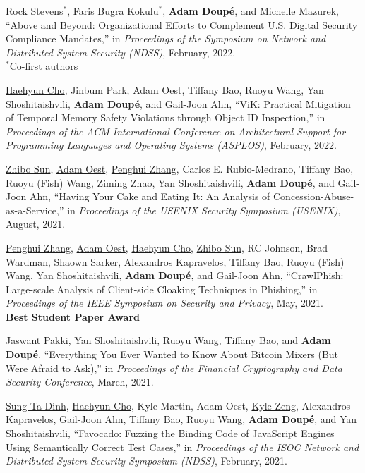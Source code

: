 \documentclass[11pt,letterpaper,sans]{moderncv}
\begin{document}
\begin{etaremune}
\item Rock Stevens$^*$,  \underline{Faris Bugra Kokulu}$^*$,  \textbf{Adam Doup\'e}, and  Michelle Mazurek,  ``Above and Beyond: Organizational Efforts to Complement U.S. Digital Security Compliance Mandates,'' in \emph{Proceedings of the Symposium on Network and Distributed System Security (NDSS)}, February, 2022. \\
  $^*$Co-first authors
  
\item \underline{Haehyun Cho}, Jinbum Park, Adam Oest, Tiffany Bao,  Ruoyu Wang,  Yan Shoshitaishvili,  \textbf{Adam Doup\'e}, and  Gail-Joon Ahn, ``ViK: Practical Mitigation of Temporal Memory Safety Violations through Object ID Inspection,'' in \emph{Proceedings of the ACM International Conference on Architectural Support for Programming Languages and Operating Systems (ASPLOS)}, February, 2022.

\item \underline{Zhibo Sun}, \underline{Adam Oest}, \underline{Penghui Zhang}, Carlos E. Rubio-Medrano, Tiffany Bao, Ruoyu (Fish) Wang, Ziming Zhao, Yan Shoshitaishvili, \textbf{Adam Doup\'e}, and Gail-Joon Ahn, ``Having Your Cake and Eating It: An Analysis of Concession-Abuse-as-a-Service,'' in \emph{Proceedings of the USENIX Security Symposium (USENIX)}, August, 2021.

\item \underline{Penghui Zhang}, \underline{Adam Oest}, \underline{Haehyun Cho}, \underline{Zhibo Sun}, RC Johnson, Brad Wardman, Shaown Sarker, Alexandros Kapravelos, Tiffany Bao, Ruoyu (Fish) Wang, Yan Shoshitaishvili, \textbf{Adam Doup\'e}, and Gail-Joon Ahn, ``CrawlPhish: Large-scale Analysis of Client-side Cloaking Techniques in Phishing,'' in \emph{Proceedings of the IEEE Symposium on Security and Privacy}, May, 2021. \\
  \textbf{Best Student Paper Award}

\item \underline{Jaswant Pakki}, Yan Shoshitaishvili, Ruoyu Wang, Tiffany Bao, and \textbf{Adam Doup\'e}. ``Everything You Ever Wanted to Know About Bitcoin Mixers (But Were Afraid to Ask),'' in \emph{Proceedings of the Financial Cryptography and Data Security Conference}, March, 2021. 

\item \underline{Sung Ta Dinh}, \underline{Haehyun Cho}, Kyle Martin, Adam Oest, \underline{Kyle Zeng}, Alexandros Kapravelos, Gail-Joon Ahn, Tiffany Bao, Ruoyu Wang, \textbf{Adam Doup\'e}, and Yan Shoshitaishvili, ``Favocado: Fuzzing the Binding Code of JavaScript Engines Using Semantically Correct Test Cases,'' in \emph{Proceedings of the ISOC Network and Distributed System Security Symposium (NDSS)}, February, 2021.


\end{etaremune}
\end{document}
